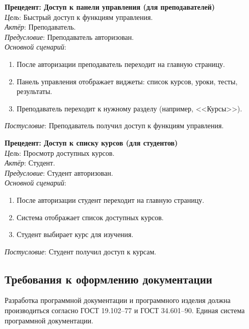 \begin{enumerate}
	\textbf{Прецедент: Доступ к панели управления (для преподавателей)} \\
	\textit{Цель}: Быстрый доступ к функциям управления. \\
	\textit{Актёр}: Преподаватель. \\
	\textit{Предусловие}: Преподаватель авторизован. \\
	\textit{Основной сценарий}:
	\begin{enumerate}
		\item После авторизации преподаватель переходит на главную страницу.
		\item Панель управления отображает виджеты: список курсов, уроки, тесты, результаты.
		\item Преподаватель переходит к нужному разделу (например, <<Курсы>>).
	\end{enumerate}
	\textit{Постусловие}: Преподаватель получил доступ к функциям управления.
	
	\textbf{Прецедент: Доступ к списку курсов (для студентов)} \\
	\textit{Цель}: Просмотр доступных курсов. \\
	\textit{Актёр}: Студент. \\
	\textit{Предусловие}: Студент авторизован. \\
	\textit{Основной сценарий}:
	\begin{enumerate}
		\item После авторизации студент переходит на главную страницу.
		\item Система отображает список доступных курсов.
		\item Студент выбирает курс для изучения.
	\end{enumerate}
	\textit{Постусловие}: Студент получил доступ к курсам.
\end{enumerate}

\subsection{Требования к оформлению документации}

Разработка программной документации и программного изделия должна производиться согласно ГОСТ 19.102–77 и ГОСТ 34.601–90. Единая система программной документации.
